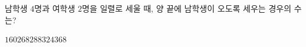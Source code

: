 \hspace*{2mm}\begin{minipage}[t]{\dimexpr\linewidth-2mm\relax}\vspace{0pt}
남학생 $4$명과 여학생 $2$명을 일렬로 세울 때, 양 끝에 남학생이 오도록 세우는 경우의 수는?
\begin{choices32}{$160$}{$268$}{$288$}{$324$}{$368$}\end{choices32}\end{minipage}
